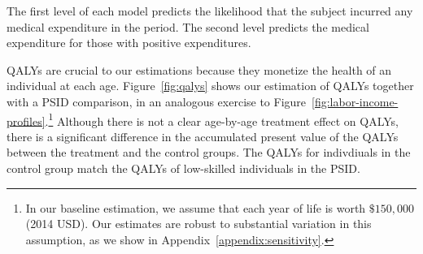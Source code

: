 The first level of each model predicts the likelihood that the subject incurred any medical expenditure in the period. The second level predicts the medical expenditure for those with positive expenditures.

QALYs are crucial to our estimations because they monetize the health of an individual at each age. Figure~\ref{fig:qalys} shows our estimation of QALYs together with a PSID comparison, in an analogous exercise to Figure~\ref{fig:labor-income-profiles}.\footnote{In our baseline estimation, we assume that each year of life is worth  $\$150,000$ (2014 USD). Our estimates are robust to substantial variation in this assumption, as we show in Appendix~\ref{appendix:sensitivity}.} Although there is not a clear age-by-age treatment effect on QALYs, there is a significant difference in the accumulated present value of the QALYs between the treatment and the control groups. The QALYs for indivdiuals in the control group match the QALYs of low-skilled individuals in the PSID.

